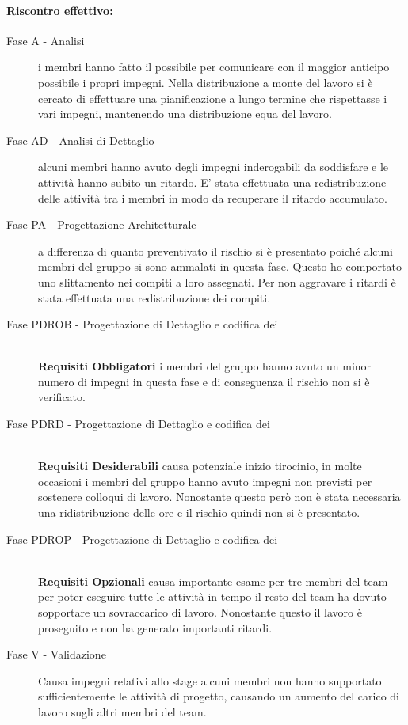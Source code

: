 \documentclass[../PianoProgetto.tex]{subfiles}
\begin{document}
	\paragraph*{Riscontro effettivo:}
		\begin{description}
			\item[Fase A - Analisi] i membri hanno fatto il possibile per comunicare con il maggior anticipo possibile i propri impegni. Nella distribuzione a monte del lavoro si è cercato di effettuare una pianificazione a lungo termine che rispettasse i vari impegni, mantenendo una distribuzione equa del lavoro.
			\item[Fase AD - Analisi di Dettaglio] alcuni membri hanno avuto degli impegni inderogabili da soddisfare e le attività hanno subito un ritardo. E' stata effettuata una redistribuzione delle attività tra i membri in modo da recuperare il ritardo accumulato. 
			\item[Fase PA - Progettazione Architetturale] a differenza  di quanto preventivato il rischio si è presentato poiché alcuni membri del gruppo si sono ammalati in questa fase. Questo ho comportato uno slittamento nei compiti a loro assegnati. Per non aggravare i ritardi è stata effettuata una redistribuzione dei compiti.
			\item[Fase PDROB - Progettazione di Dettaglio e codifica dei]  \ \\
					\textbf{Requisiti Obbligatori} i membri del gruppo hanno avuto un minor numero di impegni in questa fase e di conseguenza il rischio non si è verificato.
			\item[Fase PDRD - Progettazione di Dettaglio e codifica dei] \ \\
					\textbf{Requisiti Desiderabili} causa potenziale inizio tirocinio, in molte occasioni i membri del gruppo hanno avuto impegni non previsti per sostenere colloqui di lavoro. Nonostante questo però non è stata necessaria una ridistribuzione delle ore e il rischio quindi non si è presentato.
			\item[Fase PDROP - Progettazione di Dettaglio e codifica dei]  \ \\
					\textbf{Requisiti Opzionali} causa importante esame per tre membri del team per poter eseguire tutte le attività in tempo il resto del team ha dovuto sopportare un sovraccarico di lavoro. Nonostante questo il lavoro è proseguito e non ha generato importanti ritardi.
			\item[Fase V - Validazione] Causa impegni relativi allo stage alcuni membri non hanno 			supportato sufficientemente le attività di progetto, causando un aumento del 			carico di lavoro sugli altri membri del team.	
		\end{description}
	
\end{document}
